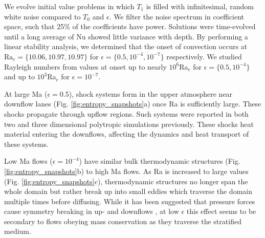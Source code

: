 \documentclass[aps, prl, twocolumn, nofootinbib, groupedaddress, amsfonts, amssymb, amsmath]{revtex4-1}
\begin{document}
We evolve initial value problems in which $T_1$ is
filled with infinitesimal, random white noise compared to $T_0$ and $\epsilon$.
We filter the noise spectrum in coefficient space, such that 25\% of the coefficients
have power.
Solutions were time-evolved until a long average of Nu showed little
variance with depth. By performing a linear stability analysis, 
we determined that the onset of convection
occurs at $\text{Ra}_c = \{10.06, 10.97, 10.97\}$ for $\epsilon = \{0.5, 10^{-4}, 10^{-7}\}$ respectively.  
We studied Rayleigh
numbers from values at onset up to nearly $10^6$Ra$_c$ for $\epsilon = \{0.5, 10^{-4}\}$ 
and up to $10^3$Ra$_c$ for $\epsilon = 10^{-7}$.

At large Ma ($\epsilon = 0.5$), shock systems form in the upper atmosphere near downflow lanes 
(Fig. \ref{fig:entropy_snapshots}a) once Ra is sufficiently large.
These shocks propagate through upflow regions.  
Such systems were reported in
both two \cite{cattaneo&all1990} and three \cite{malagoli&all1990} dimensional polytropic simulations previously.
These shocks heat material entering the downflows, affecting the dynamics and heat transport
of these systems.

Low Ma flows ($\epsilon = 10^{-4}$)
have similar bulk thermodynamic structures (Fig. \ref{fig:entropy_snapshots}b)
to high Ma flows.
As Ra is increased to large values 
(Fig. \ref{fig:entropy_snapshots}c), thermodynamic structures 
no longer span the whole domain but rather break up into 
small eddies which traverse the domain multiple
times before diffusing.  
While it has been suggested that pressure forces 
cause symmetry breaking in up- and downflows
\cite{hurlburt&all1984}, at low $\epsilon$ this 
effect seems to be secondary to flows obeying mass conservation as they traverse
the stratified medium.  
\end{document}
